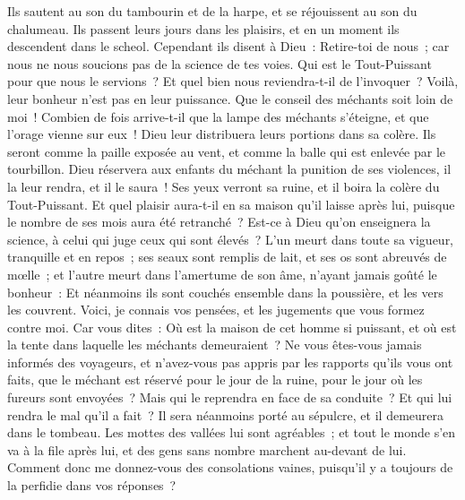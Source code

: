 \begin{multicols}{2}
Ils sautent au son du tambourin et de la harpe, et se réjouissent au son du chalumeau. 
Ils passent leurs jours dans les plaisirs, et en un moment ils descendent dans le scheol.
 Cependant ils disent à Dieu~: Retire-toi de nous~; car nous ne nous soucions pas de la science de tes voies. 
Qui est le Tout-Puissant pour que nous le servions~? Et quel bien nous reviendra-t-il de l'invoquer~?
Voilà, leur bonheur n'est pas en leur puissance. Que le conseil des méchants soit loin de moi~!
Combien de fois arrive-t-il que la lampe des méchants s'éteigne, et que l'orage vienne sur eux~! Dieu leur distribuera leurs portions dans sa colère.
Ils seront comme la paille exposée au vent, et comme la balle qui est enlevée par le tourbillon.
Dieu réservera aux enfants du méchant la punition de ses violences, il la leur rendra, et il le saura~!
Ses yeux verront sa ruine, et il boira la colère du Tout-Puissant.
Et quel plaisir aura-t-il en sa maison qu'il laisse après lui, puisque le nombre de ses mois aura été retranché~? 
Est-ce à Dieu qu'on enseignera la science, à celui qui juge ceux qui sont élevés~?
L'un meurt dans toute sa vigueur, tranquille et en repos~; 
ses seaux sont remplis de lait, et ses os sont abreuvés de mœlle~; 
et l'autre meurt dans l'amertume de son âme, n'ayant jamais goûté le bonheur~: 
Et néanmoins ils sont couchés ensemble dans la poussière, et les vers les couvrent. 
Voici, je connais vos pensées, et les jugements que vous formez contre moi. 
Car vous dites~: Où est la maison de cet homme si puissant, et où est la tente dans laquelle les méchants demeuraient~?
Ne vous êtes-vous jamais informés des voyageurs, et n'avez-vous pas appris par les rapports qu'ils vous ont faits,
que le méchant est réservé pour le jour de la ruine, pour le jour où les fureurs sont envoyées~?
Mais qui le reprendra en face de sa conduite~? Et qui lui rendra le mal qu'il a fait~?
Il sera néanmoins porté au sépulcre, et il demeurera dans le tombeau.
Les mottes des vallées lui sont agréables~; et tout le monde s'en va à la file après lui, et des gens sans nombre marchent au-devant de lui. 
Comment donc me donnez-vous des consolations vaines, puisqu'il y a toujours de la perfidie dans vos réponses~?

\end{multicols}
